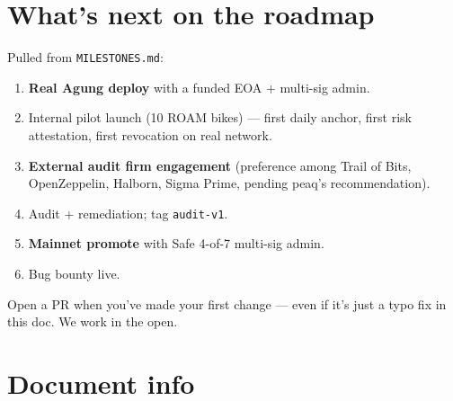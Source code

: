 \documentclass[11pt,a4paper]{article}
\begin{document}
\section{What's next on the roadmap}

Pulled from \texttt{MILESTONES.md}:

\begin{enumerate}[leftmargin=*]
  \item \textbf{Real Agung deploy} with a funded EOA + multi-sig admin.
  \item Internal pilot launch (10 ROAM bikes) --- first daily anchor, first risk attestation, first revocation on real network.
  \item \textbf{External audit firm engagement} (preference among Trail of Bits, OpenZeppelin, Halborn, Sigma Prime, pending peaq's recommendation).
  \item Audit + remediation; tag \texttt{audit-v1}.
  \item \textbf{Mainnet promote} with Safe 4-of-7 multi-sig admin.
  \item Bug bounty live.
\end{enumerate}

\vspace{0.6cm}

\begin{successbox}[title=Welcome aboard]
Open a PR when you've made your first change --- even if it's just a typo fix in this doc. We work in the open.
\end{successbox}

\newpage
\section*{\color{axiprimary}Document info}

\vspace{0.4cm}


\vspace{0.6cm}
\end{document}
